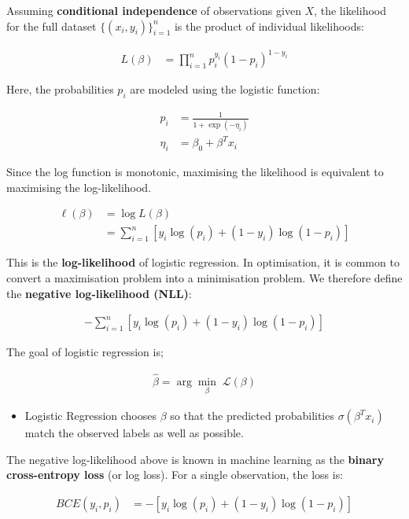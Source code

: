 \documentclass[10pt,a4paper]{article}
\begin{document}
	Assuming \textbf{conditional independence} of observations given $X$, the likelihood for the full dataset $\{(x_i,y_i)\}_{i=1}^n$ is the product of individual likelihoods:


	\begin{align*}
		L(\beta)&= \prod_{i=1}^{n} p_i^{y_i}(1-p_i)^{1-y_i}
	\end{align*}


	Here, the probabilities $p_i$ are modeled using the logistic function:

	\begin{align*}
		p_i&= \frac{1}{1 + \exp(-\eta_i)}\\
		\eta_i&= \beta_0 + \beta^T x_i
	\end{align*}


	Since the log function is monotonic, maximising the likelihood is equivalent to maximising the log-likelihood.

	\begin{align*}
		\ell(\beta)&= \log L(\beta)\\
		&= \sum_{i=1}^{n} \left[ y_i \log(p_i) + (1-y_i)\log(1-p_i) \right]
	\end{align*}


	This is the \textbf{log-likelihood} of logistic regression.
	In optimisation, it is common to convert a maximisation problem into a minimisation problem. We therefore define the \textbf{negative log-likelihood (NLL)}:

	\begin{align*}
		- \sum_{i=1}^{n} \left[ y_i \log(p_i) + (1-y_i)\log(1-p_i) \right]
	\end{align*}


	The goal of logistic regression is;

	\begin{align*}
		\hat{\beta}= \arg\min_{\beta} \; \mathcal{L}(\beta)
	\end{align*}


	\begin{itemize}
		\item Logistic Regression chooses $\beta$ so that the predicted probabilities $\sigma(\beta^T x_i)$ match the observed labels as well as possible.
	\end{itemize}

	The negative log-likelihood above is known in machine learning as the \textbf{binary cross-entropy loss} (or log loss).
	For a single observation, the loss is:

	\begin{align*}
		BCE(y_i, p_i)&= - \left[ y_i \log(p_i) + (1-y_i)\log(1-p_i) \right]
	\end{align*}
\end{document}
